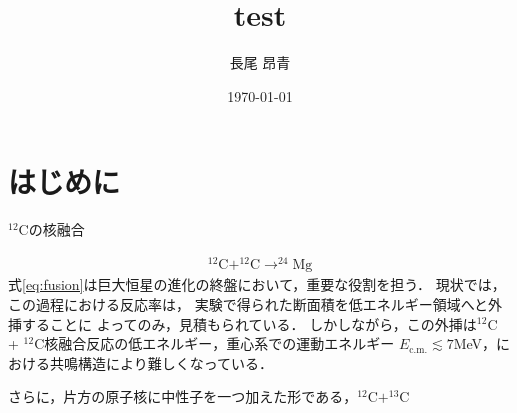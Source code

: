 \documentclass[a4paper,11pt]{ltjsarticle}
\begin{document}
\title{test}
\author{長尾 昂青}
\date{\today}
\maketitle

\tableofcontents

\newpage
\section{はじめに}

$^{12}$Cの核融合

\begin{align}\label{eq:fusion}
  ^{12} \text{C} + ^{12} \text{C} \rightarrow ^{24} \text{Mg}
\end{align}
式\ref{eq:fusion}は巨大恒星の進化の終盤において，重要な役割を担う．
現状では，この過程における反応率は，
実験で得られた断面積を低エネルギー領域へと外挿することに
よってのみ，見積もられている．
しかしながら，この外挿は$^{12}$C + $^{12}$C核融合反応の低エネルギー，重心系での運動エネルギー
$E_\text{c.m.} \lesssim 7$MeV，における共鳴構造により難しくなっている．

さらに，片方の原子核に中性子を一つ加えた形である，$^{12}\mathrm{C} + ^{13}\mathrm{C}$
\end{document}
